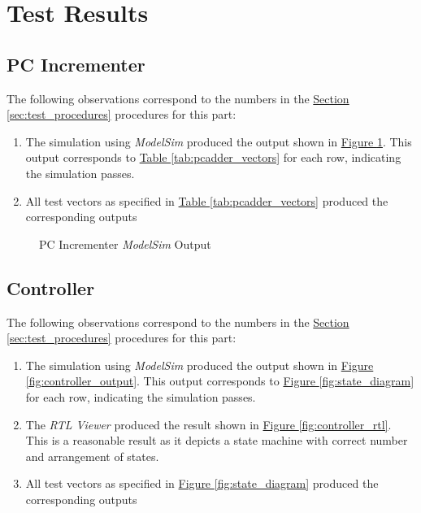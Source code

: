 \section{Test Results} %
\label{sec:test_results}

\FloatBarrier \subsection{PC Incrementer} %
\label{sub:pc_incrementer} \FloatBarrier

The following observations correspond to the numbers in the \hyperref[sec:test_procedures]{Section \ref*{sec:test_procedures}} procedures for this part:

\begin{enumerate}
    \item The simulation using \emph{ModelSim} produced the output shown in \hyperref[fig:pcadder_output]{Figure \ref*{fig:pcadder_output}}.
    This output corresponds to \hyperref[tab:pcadder_vectors]{Table \ref*{tab:pcadder_vectors}} for each row, indicating the simulation passes.
    \item All test vectors as specified in \hyperref[tab:pcadder_vectors]{Table \ref*{tab:pcadder_vectors}} produced the corresponding outputs
\end{enumerate}

\begin{figure}
    \caption{PC Incrementer \emph{ModelSim} Output\label{fig:pcadder_output}}
\end{figure}


\FloatBarrier \subsection{Controller} %
\label{sub:controller} \FloatBarrier

The following observations correspond to the numbers in the \hyperref[sec:test_procedures]{Section \ref*{sec:test_procedures}} procedures for this part:

\begin{enumerate}
    \item The simulation using \emph{ModelSim} produced the output shown in \hyperref[fig:controller_output]{Figure \ref*{fig:controller_output}}.
    This output corresponds to \hyperref[fig:state_diagram]{Figure \ref*{fig:state_diagram}} for each row, indicating the simulation passes.
    \item The \emph{RTL Viewer} produced the result shown in \hyperref[fig:controller_rtl]{Figure \ref*{fig:controller_rtl}}.
    This is a reasonable result as it depicts a state machine with correct number and arrangement of states.
    \item All test vectors as specified in \hyperref[fig:state_diagram]{Figure \ref*{fig:state_diagram}} produced the corresponding outputs
\end{enumerate}


